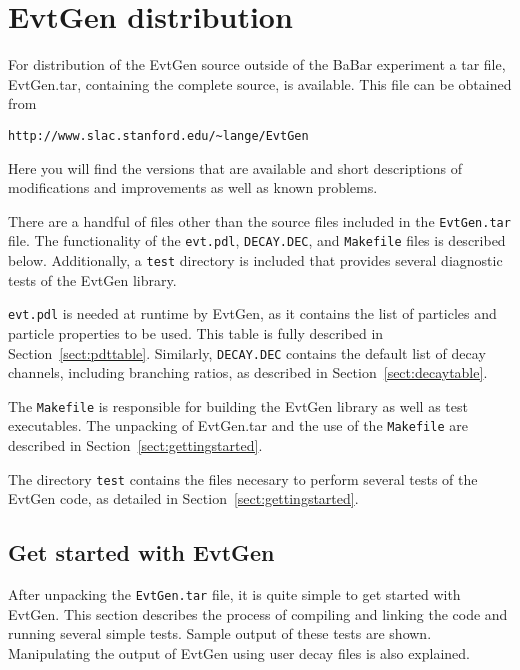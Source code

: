\section{EvtGen distribution}
\label{sect:tarfile}

For distribution of the EvtGen source outside of the BaBar experiment
a tar file, EvtGen.tar, containing the complete source, is
available. This file can be obtained from
\begin{verbatim}
http://www.slac.stanford.edu/~lange/EvtGen 
\end{verbatim}
Here you will find the versions that are available and short descriptions
of modifications and improvements as well as known problems.  

There are a handful of files other than the source files
included in the {\tt EvtGen.tar} file.  The functionality
of the  {\tt evt.pdl}, {\tt DECAY.DEC}, 
and {\tt Makefile}
files is described below.  Additionally, a {\tt test} 
directory is included that provides several diagnostic
tests of the EvtGen library.

{\tt evt.pdl} is needed at runtime by EvtGen, as
it contains the list of particles and particle
properties to be used.  This table is fully described in
Section~\ref{sect:pdttable}.  Similarly, {\tt DECAY.DEC}
contains the default list of decay channels, including
branching ratios, as 
described in Section~\ref{sect:decaytable}.

The {\tt Makefile} is responsible for building the EvtGen library
as well as test executables.  The unpacking of EvtGen.tar 
and the use of the {\tt Makefile} are described in
Section~\ref{sect:gettingstarted}.

The directory {\tt test} contains the files necesary to
perform several tests of the EvtGen code, 
as detailed in Section~\ref{sect:gettingstarted}.

\subsection{Get started with EvtGen}
\label{sect:examples}
\label{sect:gettingstarted}

After unpacking the {\tt EvtGen.tar} file, 
it is quite simple to get started with EvtGen.  This
section describes the process of compiling and
linking the code and running several simple tests.  Sample output
of these tests are shown.  Manipulating the output
of EvtGen using user decay files is also explained.

